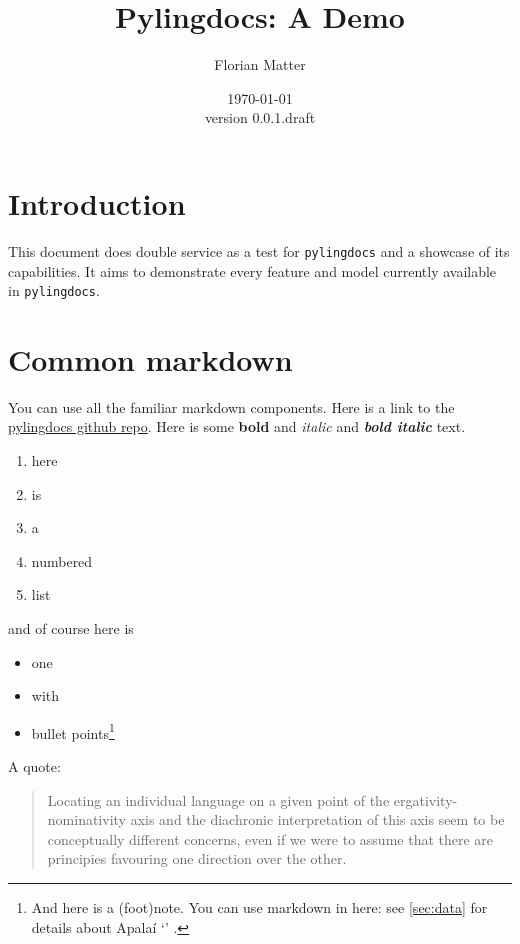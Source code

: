 \documentclass{article}
\title{Pylingdocs: A Demo}
\author{Florian Matter}
\date{\today\\version 0.0.1.draft}
\begin{document}
\maketitle

\tableofcontents


\section{\texorpdfstring{Introduction \label{sec:intro}}{Introduction }}

This document does double service as a test for \texttt{pylingdocs} and
a showcase of its capabilities. It aims to demonstrate every feature and
model currently available in \texttt{pylingdocs}.

\section{\texorpdfstring{Common
markdown\label{common-markdown}}{Common markdown}}

You can use all the familiar markdown components. Here is a link to the
\href{https://github.com/fmatter/pylingdocs/}{pylingdocs github repo}.
Here is some \textbf{bold} and \emph{italic} and \textbf{\emph{bold
italic}} text.

\begin{enumerate}
\def\labelenumi{\arabic{enumi}.}
\tightlist
\item
  here
\item
  is
\item
  a
\item
  numbered
\item
  list
\end{enumerate}

and of course here is

\begin{itemize}
\tightlist
\item
  one
\item
  with
\item
  bullet points\footnote{And here is a (foot)note. You can use markdown
    in here: see \cref{sec:data} for details about Apalaí 
    `' \parencites[77]{koehn1986apalai}.}
\end{itemize}

A quote:

\begin{quote}
Locating an individual language on a given point of the
ergativity-nominativity axis and the diachronic interpretation of this
axis seem to be conceptually different concerns, even if we were to
assume that there are principies favouring one direction over the other.
\parencites[71]{alvarez1998split}
\end{quote}
\end{document}
